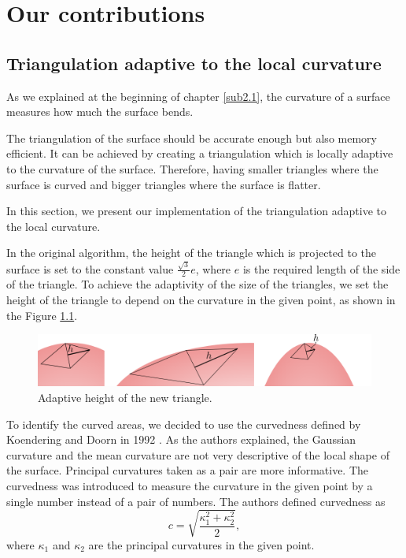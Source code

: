 \chapter{Our contributions}
\label{chap2}

\section{Triangulation adaptive to the local curvature}
\label{sub3.1}

As we explained at the beginning of chapter \ref{sub2.1}, the curvature of a surface
measures how much the surface bends.

The triangulation of the surface should be accurate enough but also memory efficient.
It can be achieved by creating a triangulation which is locally adaptive to the
curvature of the surface. Therefore, having smaller triangles where
the surface is curved and bigger triangles where the surface is flatter.

In this section, we present our implementation of the triangulation adaptive
to the local curvature.

In the original algorithm, the height of the triangle which is projected
to the surface is set to the constant value $\frac{\sqrt{3}}{2}e$, where $e$ 
is the required length of the side of the triangle. To achieve the adaptivity
of the size of the triangles, we set the height of the triangle to depend on the curvature in
the given point, as shown in the Figure \ref{img:15}.

\begin{figure}
    \centerline{\includegraphics[scale=0.5]{images/img15}}
    \caption[Adaptive height of the new triangle]
    {Adaptive height of the new triangle.}
    \label{img:15}
\end{figure}

To identify the curved areas, we decided to use the curvedness defined by 
Koendering and Doorn in 1992 \cite{koenderink1992surface}. As the authors 
explained, the Gaussian curvature and the mean curvature are not very descriptive
of the local shape of the surface. Principal curvatures taken as a pair
are more informative. The curvedness was introduced to measure 
the curvature in the given point by a single number instead of a
pair of numbers. The authors defined curvedness as 
$$c=\sqrt{\frac{\kappa_1^2+\kappa_2^2}{2}},$$
where $\kappa_1$ and $\kappa_2$ are the principal curvatures in the given point.

